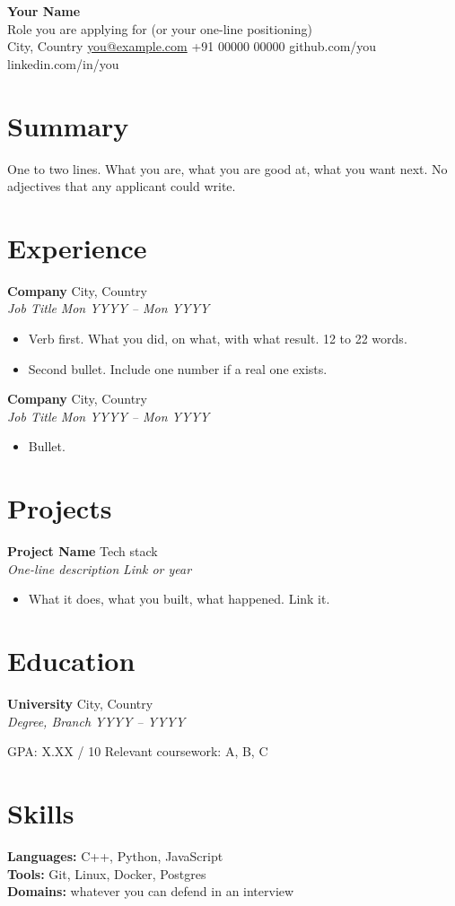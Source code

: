 \documentclass[10pt,a4paper]{article}
\newcommand{\role}[4]{%
  \textbf{#1} \hfill #2\\%
  \textit{#3} \hfill \textit{#4}\par\vspace{0.15em}%
}
\newcommand{\itemline}[1]{\item #1}
\newenvironment{bullets}{%
  \begin{itemize}[leftmargin=1.1em,itemsep=0.15em,topsep=0.15em,parsep=0pt,label=\textbullet]%
}{\end{itemize}}
\begin{document}
\begin{center}
  {\LARGE\bfseries Your Name}\\[0.25em]
  Role you are applying for (or your one-line positioning)\\[0.3em]
  \small
  City, Country \textbar{}
  \href{mailto:you@example.com}{you@example.com} \textbar{}
  +91 00000 00000 \textbar{}
  github.com/you \textbar{}
  linkedin.com/in/you
\end{center}

\section{Summary}
One to two lines. What you are, what you are good at, what you want next.
No adjectives that any applicant could write.

\section{Experience}
\role{Company}{City, Country}{Job Title}{Mon YYYY -- Mon YYYY}
\begin{bullets}
  \itemline{Verb first. What you did, on what, with what result. 12 to 22 words.}
  \itemline{Second bullet. Include one number if a real one exists.}
\end{bullets}

\role{Company}{City, Country}{Job Title}{Mon YYYY -- Mon YYYY}
\begin{bullets}
  \itemline{Bullet.}
\end{bullets}

\section{Projects}
\role{Project Name}{Tech stack}{One-line description}{Link or year}
\begin{bullets}
  \itemline{What it does, what you built, what happened. Link it.}
\end{bullets}

\section{Education}
\role{University}{City, Country}{Degree, Branch}{YYYY -- YYYY}
GPA: X.XX / 10 \quad Relevant coursework: A, B, C

\section{Skills}
\textbf{Languages:} C++, Python, JavaScript\\
\textbf{Tools:} Git, Linux, Docker, Postgres\\
\textbf{Domains:} whatever you can defend in an interview
\end{document}
